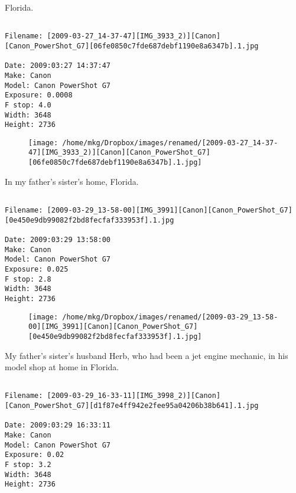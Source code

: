 \clearpage
\onecolumn
\noindent Florida.
\noindent
\begin{lstlisting}

Filename: [2009-03-27_14-37-47][IMG_3933_2)][Canon][Canon_PowerShot_G7][06fe0850c7fde687debf1190e8a6347b].1.jpg

Date: 2009:03:27 14:37:47
Make: Canon
Model: Canon PowerShot G7
Exposure: 0.0008
F stop: 4.0
Width: 3648
Height: 2736
\end{lstlisting}
\clearpage

\begin{figure}
\texttt{[image: /home/mkg/Dropbox/images/renamed/[2009-03-27\_14-37-47][IMG\_3933\_2)][Canon][Canon\_PowerShot\_G7][06fe0850c7fde687debf1190e8a6347b].1.jpg]}
\end{figure}
    
\clearpage
\onecolumn
\noindent In my father's sister's home, Florida.
\noindent
\begin{lstlisting}

Filename: [2009-03-29_13-58-00][IMG_3991][Canon][Canon_PowerShot_G7][0e450e9db99082f2bd8fecfaf333953f].1.jpg

Date: 2009:03:29 13:58:00
Make: Canon
Model: Canon PowerShot G7
Exposure: 0.025
F stop: 2.8
Width: 3648
Height: 2736
\end{lstlisting}
\clearpage

\begin{figure}
\texttt{[image: /home/mkg/Dropbox/images/renamed/[2009-03-29\_13-58-00][IMG\_3991][Canon][Canon\_PowerShot\_G7][0e450e9db99082f2bd8fecfaf333953f].1.jpg]}
\end{figure}
    
\clearpage
\onecolumn
\noindent My father's sister's husband Herb, who had been a jet engine mechanic, in his model shop at home in Florida.
\noindent
\begin{lstlisting}

Filename: [2009-03-29_16-33-11][IMG_3998_2)][Canon][Canon_PowerShot_G7][d1f87e4ff942e2fee95a04206b38b641].1.jpg

Date: 2009:03:29 16:33:11
Make: Canon
Model: Canon PowerShot G7
Exposure: 0.02
F stop: 3.2
Width: 3648
Height: 2736
\end{lstlisting}
\clearpage

